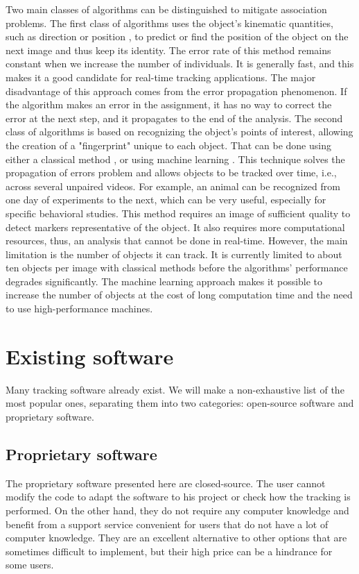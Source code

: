     Two main classes of algorithms can be distinguished to mitigate association problems. The first class of algorithms uses the object's kinematic quantities, such as direction or position \cite{rodriguez2017toxid, qian2016effective}, to predict or find the position of the object on the next image and thus keep its identity. The error rate of this method remains constant when we increase the number of individuals. It is generally fast, and this makes it a good candidate for real-time tracking applications. The major disadvantage of this approach comes from the error propagation phenomenon. If the algorithm makes an error in the assignment, it has no way to correct the error at the next step, and it propagates to the end of the analysis.
    The second class of algorithms is based on recognizing the object's points of interest, allowing the creation of a "fingerprint" unique to each object. That can be done using either a classical method \cite{perez2014idtracker, bai2018automatic}, or using machine learning \cite{mathis2018deeplabcut, romero2019idtracker}. This technique solves the propagation of errors problem and allows objects to be tracked over time, i.e., across several unpaired videos. For example, an animal can be recognized from one day of experiments to the next, which can be very useful, especially for specific behavioral studies. This method requires an image of sufficient quality to detect markers representative of the object. It also requires more computational resources, thus, an analysis that cannot be done in real-time. However, the main limitation is the number of objects it can track. It is currently limited to about ten objects per image with classical methods before the algorithms' performance degrades significantly. The machine learning approach makes it possible to increase the number of objects at the cost of long computation time and the need to use high-performance machines.

	\section{Existing software}
        Many tracking software already exist. We will make a non-exhaustive list of the most popular ones, separating them into two categories: open-source software and proprietary software.
        \subsection{Proprietary software}
        The proprietary software presented here are closed-source. The user cannot modify the code to adapt the software to his project or check how the tracking is performed. On the other hand, they do not require any computer knowledge and benefit from a support service convenient for users that do not have a lot of computer knowledge. They are an excellent alternative to other options that are sometimes difficult to implement, but their high price can be a hindrance for some users.

